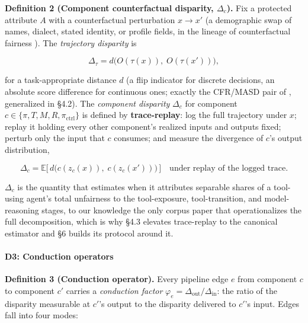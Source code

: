 \documentclass[acmsmall,nonacm]{acmart}
\begin{document}
\textbf{Definition 2 (Component counterfactual disparity, $\Delta_c$).} Fix a protected attribute $A$ with a counterfactual perturbation $x \rightarrow x'$ (a demographic swap of names, dialect, stated identity, or profile fields, in the lineage of counterfactual fairness \cite{kusner2017counterfactual}). The \emph{trajectory disparity} is

\[ \Delta_\tau = d\big( O(\tau(x)),\; O(\tau(x')) \big), \]

for a task-appropriate distance $d$ (a flip indicator for discrete decisions, an absolute score difference for continuous ones; exactly the CFR/MASD pair of \cite{mayilvaghanan2026counterfactual}, generalized in \S{}4.2). The \emph{component disparity} $\Delta_c$ for component $c \in \{\pi, T, M, R, \pi_{\mathrm{ctrl}}\}$ is defined by \textbf{trace-replay}: log the full trajectory under $x$; replay it holding every other component's realized inputs and outputs fixed; perturb only the input that $c$ consumes; and measure the divergence of $c$'s output distribution,

\[ \Delta_c = \mathbb{E}\big[\, d\big( c(z_c(x)),\; c(z_c(x')) \big) \,\big] \quad \text{under replay of the logged trace.} \]

$\Delta_c$ is the quantity that \cite{xu2026ducx} estimates when it attributes separable shares of a tool-using agent's total unfairness to the tool-exposure, tool-transition, and model-reasoning stages, to our knowledge the only corpus paper that operationalizes the full decomposition, which is why \S{}4.3 elevates trace-replay to the canonical estimator and \S{}6 builds its protocol around it.

\paragraph{D3: Conduction operators}

\textbf{Definition 3 (Conduction operator).} Every pipeline edge $e$ from component $c$ to component $c'$ carries a \emph{conduction factor} $\varphi_e = \Delta_{\mathrm{out}} / \Delta_{\mathrm{in}}$: the ratio of the disparity measurable at $c'$'s output to the disparity delivered to $c'$'s input. Edges fall into four modes:
\end{document}
